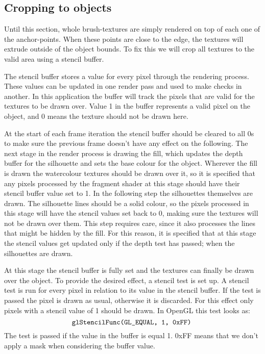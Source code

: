 \documentclass[a4paper, 12pt]{article}
\begin{document}
\subsection{Cropping to objects}
Until this section, whole brush-textures are simply rendered on top of each one of the anchor-points. When these points are close to the edge, the textures will extrude outside of the object bounds. To fix this we will crop all textures to the valid area using a stencil buffer.

The stencil buffer stores a value for every pixel through the rendering process. These values can be updated in one render pass and used to make checks in another. In this application the buffer will track the pixels that are valid for the textures to be drawn over. Value 1 in the buffer represents a valid pixel on the object, and 0 means the texture should not be drawn here.

At the start of each frame iteration the stencil buffer should be cleared to all 0s to make sure the previous frame doesn't have any effect on the following. The next stage in the render process is drawing the fill, which updates the depth buffer for the silhouette and sets the base colour for the object. Wherever the fill is drawn the watercolour textures should be drawn over it, so it is specified that any pixels processed by the fragment shader at this stage should have their stencil buffer value set to 1. In the following step the silhouettes themselves are drawn. The silhouette lines should be a solid colour, so the pixels processed in this stage will have the stencil values set back to 0, making sure the textures will not be drawn over them. This step requires care, since it also processes the lines that might be hidden by the fill. For this reason, it is specified that at this stage the stencil values get updated only if the depth test has passed; when the silhouettes are drawn.

At this stage the stencil buffer is fully set and the textures can finally be drawn over the object. To provide the desired effect, a stencil test is set up. A stencil test is run for every pixel in relation to its value in the stencil buffer. If the test is passed the pixel is drawn as usual, otherwise it is discarded. For this effect only pixels with a stencil value of 1 should be drawn. In OpenGL this test looks as:
$$\texttt{glStencilFunc(GL\_EQUAL, 1, 0xFF)\;}$$
The test is passed if the value in the buffer is equal 1. 0xFF means that we don't apply a mask when considering the buffer value.
\end{document}
